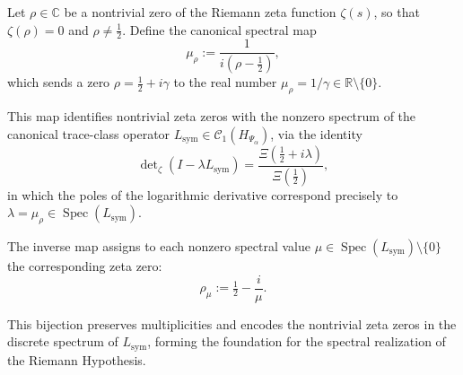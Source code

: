 \begin{definition}
\label{def:spectral-zero-map}
Let \( \rho \in \mathbb{C} \) be a nontrivial zero of the Riemann zeta function \( \zeta(s) \), so that \( \zeta(\rho) = 0 \) and \( \rho \ne \tfrac{1}{2} \). Define the canonical spectral map
\[
\mu_\rho := \frac{1}{i(\rho - \tfrac{1}{2})},
\]
which sends a zero \( \rho = \tfrac{1}{2} + i\gamma \) to the real number \( \mu_\rho = 1/\gamma \in \mathbb{R} \setminus \{0\} \).

\medskip
\noindent
This map identifies nontrivial zeta zeros with the nonzero spectrum of the canonical trace-class operator \( L_{\mathrm{sym}} \in \mathcal{C}_1(H_{\Psi_\alpha}) \), via the identity
\[
\det\nolimits_\zeta(I - \lambda L_{\mathrm{sym}}) = \frac{\Xi\left(\tfrac{1}{2} + i\lambda\right)}{\Xi\left(\tfrac{1}{2}\right)},
\]
in which the poles of the logarithmic derivative correspond precisely to \( \lambda = \mu_\rho \in \operatorname{Spec}(L_{\mathrm{sym}}) \).

\medskip
\noindent
The inverse map assigns to each nonzero spectral value \( \mu \in \operatorname{Spec}(L_{\mathrm{sym}}) \setminus \{0\} \) the corresponding zeta zero:
\[
\rho_\mu := \tfrac{1}{2} - \frac{i}{\mu}.
\]

\medskip
\noindent
This bijection preserves multiplicities and encodes the nontrivial zeta zeros in the discrete spectrum of \( L_{\mathrm{sym}} \), forming the foundation for the spectral realization of the Riemann Hypothesis.
\end{definition}
% 